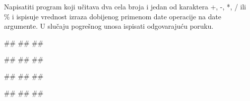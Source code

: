 \begin{Exercise}[label=p1.2_14] 
Napisatiti program koji učitava dva cela broja i jedan od karaktera +, -, *, / ili \% i ispisuje vrednost izraza dobijenog primenom date operacije na date argumente. U slučaju pogrešnog unosa ispisati odgovarajuću poruku. 

 \begin{miditest}
\begin{upotreba}{1}
#\naslovInt#
##
##
\end{upotreba}
\end{miditest}
\begin{miditest}
\begin{upotreba}{2}
#\naslovInt#
##
##
\end{upotreba}
\end{miditest}

\begin{miditest}
\begin{upotreba}{3}
#\naslovInt#
##
##
\end{upotreba}
\end{miditest}
\begin{miditest}
\begin{upotreba}{4}
#\naslovInt#
##
##
\end{upotreba}
\end{miditest}

\end{Exercise}
\ifresenja
 \begin{Answer}[ref=p1.2_14]
\end{Answer}
\fi


